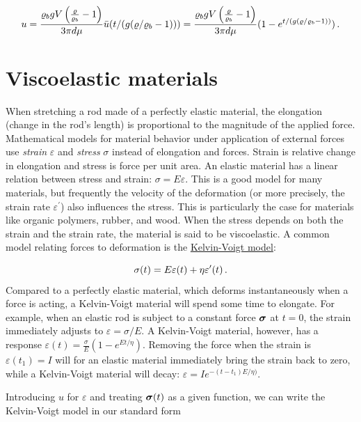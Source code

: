 \documentclass[%
oneside,                 %
final,                   %
10pt]{article}
\begin{document}
\[ u = \frac{\varrho_bgV\left(\frac{\varrho}{\varrho_b} -1\right)}{3\pi d\mu}\bar u(t/(g(\varrho/\varrho_b -1))) =
\frac{\varrho_bgV\left(\frac{\varrho}{\varrho_b} -1\right)}{3\pi d\mu}(1 -
e^{t/(g(\varrho/\varrho_b -1))})\tp\]

\section{Viscoelastic materials}
\label{decay:app:viscoelasticity}


When stretching a rod made of a perfectly elastic material, the
elongation (change in the rod's
length) is proportional to the magnitude of the applied force.
Mathematical models for material behavior under application of
external forces use \emph{strain} $\varepsilon$
and \emph{stress} $\sigma$ instead of elongation and
forces. Strain is relative change in elongation and stress is force
per unit area. An elastic material has a linear relation between
stress and strain:  $\sigma = E\varepsilon$. This is a good model
for many materials, but frequently the velocity of the deformation
(or more precisely, the strain rate $\varepsilon^{\prime}$)
also influences the stress. This is particularly the case for
materials like organic polymers, rubber, and wood. When the stress
depends on both the strain and the strain rate, the material is
said to be viscoelastic. A common model relating forces to deformation
is the \href{{https://en.wikipedia.org/wiki/Kelvin-Voigt_material}}{Kelvin-Voigt model}:

\begin{equation}
\sigma(t) = E\varepsilon(t) + \eta\varepsilon^{\prime}(t)\tp
\label{decay:app:viscoelasticity:se}
\end{equation}
Compared to a perfectly elastic material, which deforms instantaneously
when a force is acting, a Kelvin-Voigt material will spend some time
to elongate. For example, when an elastic rod is subject to a constant
force $\stress$ at $t=0$, the strain immediately adjusts to $\varepsilon
=\sigma/E$. A Kelvin-Voigt material, however, has a response
$\varepsilon(t) = \frac{\sigma}{E}(1-e^{Et/\eta})$. Removing the force
when the strain is $\varepsilon(t_1) = I$ will for an elastic material
immediately bring the strain back to zero, while a Kelvin-Voigt
material will decay: $\varepsilon = Ie^{-(t-t_1)E/\eta)}$.

Introducing $u$ for $\varepsilon$ and treating $\stress(t)$ as a
given function, we can write the Kelvin-Voigt model in our standard form
\end{document}
